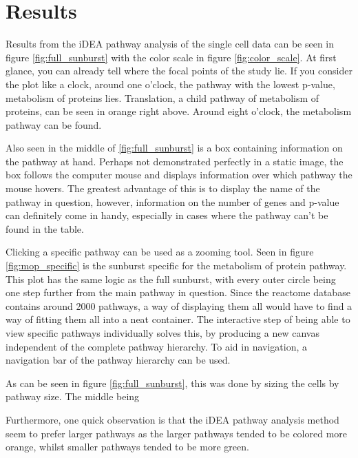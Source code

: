 \documentclass[11pt]{article}
\begin{document}
\section*{Results}

  Results from the iDEA pathway analysis of the single cell data can be seen in figure \ref{fig:full_sunburst} with the color scale in figure \ref{fig:color_scale}. At first glance, you can already tell where the focal points of the study lie. If you consider the plot like a clock, around one o'clock, the pathway with the lowest p-value, metabolism of proteins \cite{reactome} lies. Translation, a child pathway of metabolism of proteins, can be seen in orange right above. Around eight o'clock, the metabolism pathway can be found.

  Also seen in the middle of \ref{fig:full_sunburst} is a box containing information on the pathway at hand. Perhaps not demonstrated perfectly in a static image, the box follows the computer mouse and displays information over which pathway the mouse hovers. The greatest advantage of this is to display the name of the pathway in question, however, information on the number of genes and p-value can definitely come in handy, especially in cases where the pathway can't be found in the table.

  Clicking a specific pathway can be used as a zooming tool. Seen in figure \ref{fig:mop_specific} is the sunburst specific for the metabolism of protein pathway. This plot has the same logic as the full sunburst, with every outer circle being one step further from the main pathway in question. Since the reactome database contains around 2000 pathways, a way of displaying them all would have to find a way of fitting them all into a neat container. The interactive step of being able to view specific pathways individually solves this, by producing a new canvas independent of the complete pathway hierarchy. To aid in navigation, a navigation bar of the pathway hierarchy can be used.

   As can be seen in figure \ref{fig:full_sunburst}, this was done by sizing the cells by pathway size. The middle being

  Furthermore, one quick observation is that the iDEA pathway analysis method seem to prefer larger pathways as the larger pathways tended to be colored more orange, whilst smaller pathways tended to be more green.
\end{document}
